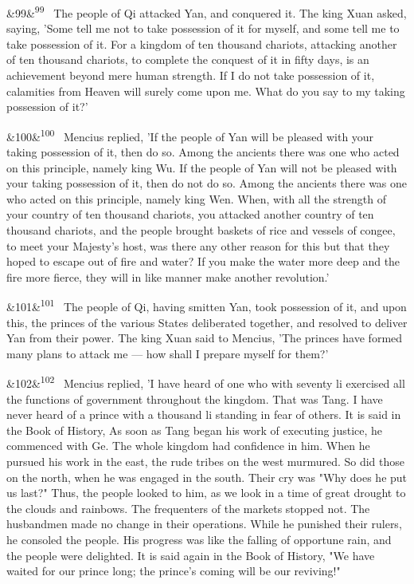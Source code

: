 \documentclass[12pt]{article}
\newcommand{\para}[1][]{\par\noindent\ifx&#1&\else\textsuperscript{\footnotesize #1}~\fi}
\begin{document}
\para[99] The people of Qi attacked Yan, and conquered it. The king Xuan asked, saying, 'Some tell me not to take possession of it for myself, and some tell me to take possession of it. For a kingdom of ten thousand chariots, attacking another of ten thousand chariots, to complete the conquest of it in fifty days, is an achievement beyond mere human strength. If I do not take possession of it, calamities from Heaven will surely come upon me. What do you say to my taking possession of it?'

\para[100] Mencius replied, 'If the people of Yan will be pleased with your taking possession of it, then do so. Among the ancients there was one who acted on this principle, namely king Wu. If the people of Yan will not be pleased with your taking possession of it, then do not do so. Among the ancients there was one who acted on this principle, namely king Wen. When, with all the strength of your country of ten thousand chariots, you attacked another country of ten thousand chariots, and the people brought baskets of rice and vessels of congee, to meet your Majesty's host, was there any other reason for this but that they hoped to escape out of fire and water? If you make the water more deep and the fire more fierce, they will in like manner make another revolution.'

\para[101] The people of Qi, having smitten Yan, took possession of it, and upon this, the princes of the various States deliberated together, and resolved to deliver Yan from their power. The king Xuan said to Mencius, 'The princes have formed many plans to attack me --- how shall I prepare myself for them?'

\para[102] Mencius replied, 'I have heard of one who with seventy li exercised all the functions of government throughout the kingdom. That was Tang. I have never heard of a prince with a thousand li standing in fear of others. It is said in the Book of History, As soon as Tang began his work of executing justice, he commenced with Ge. The whole kingdom had confidence in him. When he pursued his work in the east, the rude tribes on the west murmured. So did those on the north, when he was engaged in the south. Their cry was "Why does he put us last?" Thus, the people looked to him, as we look in a time of great drought to the clouds and rainbows. The frequenters of the markets stopped not. The husbandmen made no change in their operations. While he punished their rulers, he consoled the people. His progress was like the falling of opportune rain, and the people were delighted. It is said again in the Book of History, "We have waited for our prince long; the prince's coming will be our reviving!"
\end{document}
